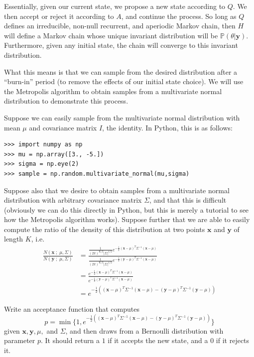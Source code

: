 Essentially, given our current state, we propose a new state according to $Q$. We then accept or reject it according to $A$, and continue the process. So long as $Q$ defines an irreducible, non-null recurrent, and aperiodic Markov chain, then $H$ will define a Markov chain whose unique invariant distribution will be $\mathbb{P}(\theta | \mathbf{y})$. Furthermore, given any initial state, the chain will converge to this invariant distribution.

What this means is that we can sample from the desired distribution after a ``burn-in'' period (to remove the effects of our initial state choice). We will use the Metropolis algorithm to obtain samples from a multivariate normal distribution to demonstrate this process.

Suppose we can easily sample from the multivariate normal distribution with mean $\mu$ and covariance matrix $I$, the identity. In Python, this is as follows:
\begin{lstlisting}
>>> import numpy as np
>>> mu = np.array([3., -5.])
>>> sigma = np.eye(2)
>>> sample = np.random.multivariate_normal(mu,sigma)
\end{lstlisting}

Suppose also that we desire to obtain samples from a multivariate normal distribution with arbitrary covariance matrix $\Sigma$, and that this is difficult (obviously we can do this directly in Python, but this is merely a tutorial to see how the Metropolis algorithm works). Suppose further that we are able to easily compute the ratio of the density of this distribution at two points $\mathbf{x}$ and $\mathbf{y}$ of length $K$, i.e.
\begin{align*}
\frac{N(\mathbf{x} \; ; \; \mu, \Sigma)}{N(\mathbf{y} \; ; \; \mu, \Sigma)} & = \frac{\frac{1}{(2\pi)^{K/2}|\Sigma|^{1/2}} e^{-\frac{1}{2}(\mathbf{x} - \mu)^{T} \Sigma^{-1} (\mathbf{x} - \mu)}}{\frac{1}{(2\pi)^{K/2}|\Sigma|^{1/2}} e^{-\frac{1}{2}(\mathbf{y} - \mu)^{T} \Sigma^{-1} (\mathbf{x} - \mu)}} \\
& = \frac{e^{-\frac{1}{2}(\mathbf{x} - \mu)^{T} \Sigma^{-1} (\mathbf{x} - \mu)}}{e^{-\frac{1}{2}(\mathbf{y} - \mu)^{T} \Sigma^{-1} (\mathbf{x} - \mu)}} \\
& = e^{-\frac{1}{2}\left((\mathbf{x} - \mu)^{T} \Sigma^{-1} (\mathbf{x} - \mu) - (\mathbf{y} - \mu)^{T} \Sigma^{-1} (\mathbf{y} - \mu)\right)}
\end{align*}

\begin{problem} \label{problem1}
Write an acceptance function that computes 
\begin{equation*}
p = \min \{1, e^{-\frac{1}{2}\left((\mathbf{x} - \mu)^{T} \Sigma^{-1} (\mathbf{x} - \mu) - (\mathbf{y} - \mu)^{T} \Sigma^{-1} (\mathbf{y} - \mu)\right)}\}
\end{equation*}
given $\mathbf{x}, \mathbf{y}, \mu,$ and $\Sigma$, and then draws from a Bernoulli distribution with parameter $p$. It should return a $1$ if it accepts the new state, and a $0$ if it rejects it.
\end{problem}

